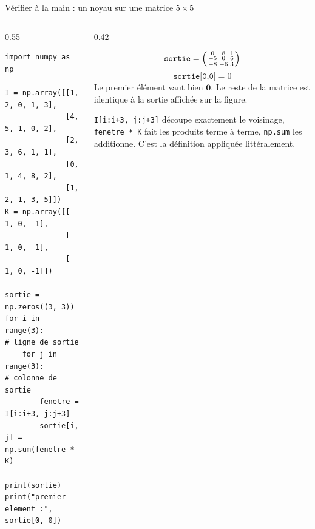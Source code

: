 \begin{frame}[fragile]{Vérifier à la main : un noyau sur une matrice $5 \times 5$}
\begin{columns}[t]
\begin{column}{0.55\textwidth}
\begin{codebox}
\begin{lstlisting}
import numpy as np

I = np.array([[1, 2, 0, 1, 3],
              [4, 5, 1, 0, 2],
              [2, 3, 6, 1, 1],
              [0, 1, 4, 8, 2],
              [1, 2, 1, 3, 5]])
K = np.array([[ 1, 0, -1],
              [ 1, 0, -1],
              [ 1, 0, -1]])

sortie = np.zeros((3, 3))
for i in range(3):            # ligne de sortie
    for j in range(3):        # colonne de sortie
        fenetre = I[i:i+3, j:j+3]
        sortie[i, j] = np.sum(fenetre * K)

print(sortie)
print("premier element :", sortie[0, 0])
\end{lstlisting}
\end{codebox}
\end{column}
\begin{column}{0.42\textwidth}
\begin{solbox}
\[
\texttt{sortie} =
\begin{psmallmatrix}
0 & 8 & 1 \\ -5 & 0 & 6 \\ -8 & -6 & 3
\end{psmallmatrix}
\]
\[
\texttt{sortie[0,0]} = 0
\]
Le premier élément vaut bien $\mathbf{0}$. Le reste de la matrice est identique à la
sortie affichée sur la figure.
\end{solbox}
\begin{kbox}
\texttt{I[i:i+3, j:j+3]} découpe exactement le voisinage, \texttt{fenetre * K} fait les
produits terme à terme, \texttt{np.sum} les additionne. C'est la définition appliquée
littéralement.
\end{kbox}
\end{column}
\end{columns}
\end{frame}


